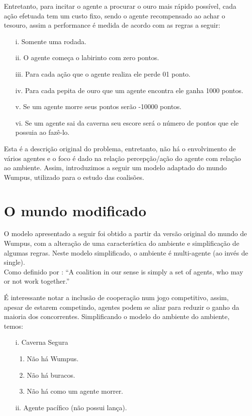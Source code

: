 \documentclass[11pt,reqno]{article}
\begin{document}
Entretanto, para incitar o agente a procurar o ouro mais rápido possível, cada ação efetuada tem um custo fixo, sendo o agente recompensado ao achar o tesouro, 
assim a performance é medida de acordo com as regras a seguir:

\begin{itemize}
\item[i.] Somente uma rodada.
\item[ii.] O agente começa o labirinto com zero pontos.
\item[iii.] Para cada ação que o agente realiza ele perde 01 ponto.
\item[iv.] Para cada pepita de ouro que um agente encontra ele ganha 1000 pontos.
\item[v.] Se um agente morre seus pontos serão -10000 pontos.
\item[vi.] Se um agente sai da caverna seu escore será o número de pontos que ele possuia ao fazê-lo.
\end{itemize}

Esta é a descrição original do problema, entretanto, não há o envolvimento de vários agentes e o foco é dado na relação percepção/ação do agente com relação ao ambiente.
Assim, introduzimos a seguir um modelo adaptado do mundo Wumpus, utilizado para o estudo das coalisões.


\section{O mundo modificado}

O modelo apresentado a seguir foi obtido a partir da versão original do mundo de Wumpus, com a alteração de uma característica do ambiente e simplificação de algumas regras.
Neste modelo simplificado, o ambiente é multi-agente (ao invés de single).\\
Como definido por \cite{wooldrige09}:
``A coalition in our sense is simply a set of agents, who may or not work together.''

É interessante notar a inclusão de cooperação num jogo competitivo, assim, apesar de estarem competindo, agentes podem se aliar para reduzir o ganho da maioria dos concorrentes.
 Simplificando o modelo do ambiente do ambiente, temos:

\begin{itemize}
\item[i.] Caverna Segura
\begin{enumerate}
\item Não há Wumpus.
\item Não há buracos.
\item Não há como um agente morrer.
\end{enumerate}
\item[ii.] Agente pacífico (não possui lança).
\end{itemize}
\end{document}
